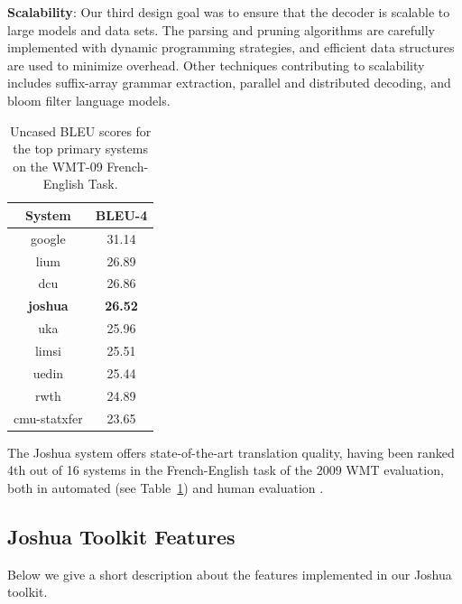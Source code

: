 \documentclass[11pt]{article}
\begin{document}
\textbf{Scalability}: Our third design goal was to ensure that the decoder is scalable to large models and data sets. The parsing and pruning algorithms are carefully implemented with dynamic programming strategies, and efficient data structures are used to minimize overhead. Other techniques contributing to scalability includes suffix-array grammar extraction, parallel and distributed decoding, and bloom filter language models.

\begin{table}[t]
\begin{center}
\begin{tabular}{c c}\hline
  System & BLEU-4 \\ \hline
  google & 31.14 \\
  lium & 26.89 \\
  dcu & 26.86 \\
  {\bf joshua} & {\bf 26.52} \\
  uka & 25.96 \\
  limsi & 25.51 \\
  uedin & 25.44 \\
  rwth & 24.89 \\
  cmu-statxfer & 23.65 \\ \hline
\end{tabular}
\end{center}
\caption{Uncased BLEU scores for the top primary systems on the WMT-09 French-English Task.}
\label{results-wmt09}
\end{table}

The Joshua system offers state-of-the-art translation quality, having been ranked 4th out of 16 systems in the French-English task of the 2009 WMT evaluation, both in automated (see Table~\ref{results-wmt09}) and human evaluation \cite{WMT09-Findings}.

\subsection{Joshua Toolkit Features}

Below we give a short description about the features implemented in our Joshua toolkit.
\end{document}
